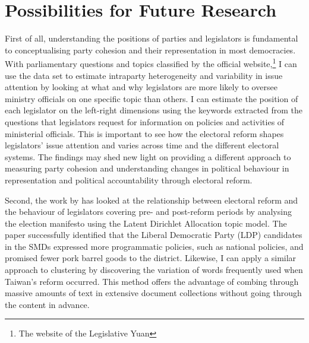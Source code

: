 

\section*{\centering Possibilities for Future Research}
First of all, understanding the positions of parties and legislators is fundamental to conceptualising party cohesion and their representation in most democracies. With parliamentary questions and topics classified by the official website,\footnote{The website of the Legislative Yuan} I can use the data set to estimate intraparty heterogeneity and variability in issue attention by looking at what and why legislators are more likely to oversee ministry officials on one specific topic than others. I can estimate the position of each legislator on the left-right dimensions using the keywords extracted from the questions that legislators request for information on policies and activities of ministerial officials. This is important to see how the electoral reform shapes legislators' issue attention and varies across time and the different electoral systems. The findings may shed new light on providing a different approach to measuring party cohesion and understanding changes in political behaviour in representation and political accountability through electoral reform.

Second, the work by \citet{Catalinac2016} has looked at the relationship between electoral reform and the behaviour of legislators covering pre- and post-reform periods by analysing the election manifesto using the Latent Dirichlet Allocation topic model. The paper successfully identified that the Liberal Democratic Party (LDP) candidates in the SMDs expressed more programmatic policies, such as national policies, and promised fewer pork barrel goods to the district. Likewise, I can apply a similar approach to clustering by discovering the variation of words frequently used when Taiwan's reform occurred. This method offers the advantage of combing through massive amounts of text in extensive document collections without going through the content in advance. 

